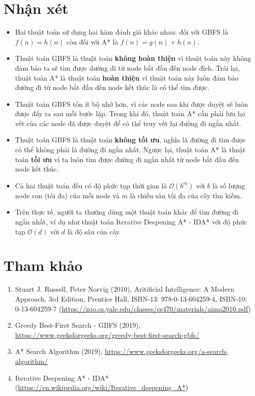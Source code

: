 \documentclass[a4paper, 11pt]{article}
\begin{document}
\section{Nhận xét}
\begin{itemize}
  \item Hai thuật toán sử dụng hai hàm đánh giá khác nhau: đối với GBFS là $f(n) = h(n)$ còn đối với A* là $f(n) = g(n) + h(n)$.
  \item Thuật toán GBFS là thuật toán \textbf{không hoàn thiện} vì thuật toán này không đảm bảo ta sẽ tìm được dường đi từ node bắt đầu đến node đích. Trái lại, thuật toán A* là thuật toán \textbf{hoàn thiện} vì thuật toán này luôn đảm bảo đường đi từ node bắt đầu đến node kết thúc là có thể tìm được.
  \item Thuật toán GBFS tốn ít bộ nhớ hơn, vì các node sau khi được duyệt sẽ luôn được đẩy ra sau mỗi bước lặp. Trong khi đó, thuật toán A* cần phải lưu lại vết của các node đã được duyệt để có thể truy vết lại đường đi ngắn nhất.
  \item Thuật toán GBFS là thuật toán \textbf{không tối ưu}, nghĩa là đường đi tìm được có thể không phải là đường đi ngắn nhất. Ngược lại, thuật toán A* là thuật toán \textbf{tối ưu} vì ta luôn tìm được đường đi ngắn nhất từ node bắt đầu đến node kết thúc.
  \item Cả hai thuật toán đều có độ phức tạp thời gian là $\mathcal{O}(b^m)$ với $b$ là số lượng node con (tối đa) của mỗi node và $m$ là chiều sâu tối đa của cây tìm kiếm.
  \item Trên thực tế, người ta thường dùng một thuật toán khác để tìm đường đi ngắn nhất, ví dụ như thuật toán Iterative Deepening A* - IDA* với độ phức tạp $\mathcal{O}(d)$ với $d$ là độ sâu của cây.
\end{itemize}


\section{Tham khảo}
\begin{enumerate}
  \item Stuart J. Russell, Peter Norvig (2010), Aritificial Intelligence: A Modern Approach, 3rd Edition, Prentice Hall, ISBN-13: 978-0-13-604259-4, ISBN-10: 0-13-604259-7 (\url{https://zoo.cs.yale.edu/classes/cs470/materials/aima2010.pdf})
  \item Greedy Best-First Search - GBFS (2019), \url{https://www.geeksforgeeks.org/greedy-best-first-search-gbfs/}
  \item A* Search Algorithm (2019), \url{https://www.geeksforgeeks.org/a-search-algorithm/}
  \item Iterative Deepening A* - IDA* (\url{https://en.wikipedia.org/wiki/Iterative_deepening_A*})
\end{enumerate}
\pagebreak
\end{document}
